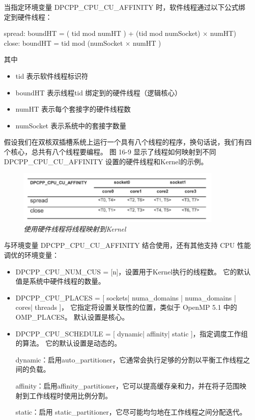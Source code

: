当指定环境变量 DPCPP\_CPU\_CU\_AFFINITY 时，软件线程通过以下公式绑定到硬件线程：

spread: boundHT = ( tid mod numHT ) + (tid mod numSocket) × numHT) close: boundHT = tid mod (numSocket × numHT )

其中

\begin{itemize}
	\item tid 表示软件线程标识符

	\item boundHT 表示线程tid 绑定到的硬件线程（逻辑核心）

	\item numHT 表示每个套接字的硬件线程数

	\item numSocket 表示系统中的套接字数量
\end{itemize}

假设我们在双核双插槽系统上运行一个具有八个线程的程序，换句话说，我们有四个核心，总共有八个线程要编程。 
图 16-9 显示了线程如何映射到不同 DPCPP\_CPU\_CU\_AFFINITY 设置的硬件线程和Kernel的示例。

\begin{figure}[H]
	\centering
	\includegraphics[width=0.9\textwidth]{figs/F16.9.png}
	\caption{\textit{使用硬件线程将线程映射到Kernel }}
\end{figure}

与环境变量 DPCPP\_CPU\_CU\_AFFINITY 结合使用，还有其他支持 CPU 性能调优的环境变量：

\begin{itemize}
	\item DPCPP\_CPU\_NUM\_CUS = [n]，设置用于Kernel执行的线程数。 它的默认值是系统中硬件线程的数量。

	\item DPCPP\_CPU\_PLACES = [ sockets| numa\_domains | numa\_domains | cores| threads ]，
	它指定将设置关联性的位置，类似于 OpenMP 5.1 中的 OMP\_PLACES。 默认设置是核心。

	\item DPCPP\_CPU\_SCHEDULE = [ dynamic| affinity| static ]，指定调度工作组的算法。 
	它的默认设置是动态的。
	
	dynamic：启用auto\_partitioner，它通常会执行足够的分割以平衡工作线程之间的负载。

	affinity：启用affinity\_partitioner，它可以提高缓存亲和力，并在将子范围映射到工作线程时使用比例分割。

	static：启用 static\_partitioner，它尽可能均匀地在工作线程之间分配迭代。
\end{itemize}


